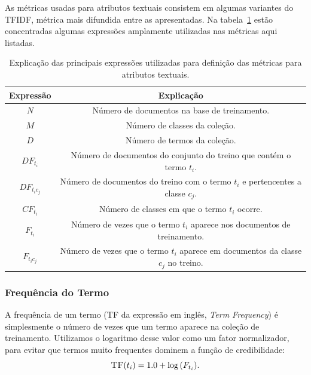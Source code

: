 As métricas usadas para atributos textuais consistem em algumas variantes do \textsc{TFIDF}, métrica mais difundida entre as apresentadas. Na tabela~\ref{table::metricas_textuais} estão concentradas algumas expressões amplamente utilizadas nas métricas aqui listadas.

\begin{table}[ht*]
\centering
\begin{tabular}{|c|c|}
\toprule
    \textbf{Expressão} & \textbf{Explicação} \\
\midrule
    $N$           & Número de documentos na base de treinamento. \tabularnewline \hline
    $M$           & Número de classes da coleção. \tabularnewline \hline
    $D$           & Número de termos da coleção. \tabularnewline \hline
    $DF_{t_i} $   & Número de documentos do conjunto do treino que contém o termo $t_i$. \tabularnewline \hline
    $DF_{t_ic_j}$ & Número de documentos do treino com o termo $t_i$ e pertencentes a classe $c_j$. \tabularnewline \hline
    $CF_{t_i}$    & Número de classes em que o termo $t_i$ ocorre. \tabularnewline \hline 
    $F_{t_i}$     & Número de vezes que o termo $t_i$ aparece nos documentos de treinamento. \tabularnewline \hline
    $F_{t_ic_j}$  & Número de vezes que o termo $t_i$ aparece em documentos da classe $c_j$ no treino. \tabularnewline 
\bottomrule
\end{tabular}
\caption{Explicação das principais expressões utilizadas para definição das métricas para atributos textuais.}
\label{table::metricas_textuais}
\end{table}


\subsubsection{Frequência do Termo} %
\label{subsubsection::sumtf}

A frequência de um termo (\textsc{TF} da expressão em inglês, \textit{Term Frequency}) é simplesmente o número de vezes que um termo aparece na coleção de treinamento. Utilizamos o logaritmo desse valor como um fator normalizador, para evitar que termos muito frequentes dominem a função de credibilidade:
\begin{equation}\label{eqn::sumtf}
   \textsc{TF}(t_i) = 1.0 + \log{ ( F_{t_i} ) }.
\end{equation}


